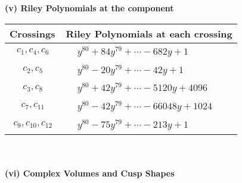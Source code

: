 \documentclass[1p]{elsarticle_modified}
\theoremstyle{definition}
\begin{document}
\newpage\renewcommand{\arraystretch}{1}
\flushleft \textbf{(v) Riley Polynomials at the component}\newline \\
\begin{tabular}{m{50pt}|m{274pt}}
Crossings & \hspace{64pt}Riley Polynomials at each crossing \\
\hline $$\begin{aligned}c_{1},c_{4},c_{6}\end{aligned}$$&$\begin{aligned}
&y^{80}+84 y^{79}+\cdots-682 y+1
\end{aligned}$\\
\hline $$\begin{aligned}c_{2},c_{5}\end{aligned}$$&$\begin{aligned}
&y^{80}-20 y^{79}+\cdots-42 y+1
\end{aligned}$\\
\hline $$\begin{aligned}c_{3},c_{8}\end{aligned}$$&$\begin{aligned}
&y^{80}+42 y^{79}+\cdots-5120 y+4096
\end{aligned}$\\
\hline $$\begin{aligned}c_{7},c_{11}\end{aligned}$$&$\begin{aligned}
&y^{80}-42 y^{79}+\cdots-66048 y+1024
\end{aligned}$\\
\hline $$\begin{aligned}c_{9},c_{10},c_{12}\end{aligned}$$&$\begin{aligned}
&y^{80}-75 y^{79}+\cdots-213 y+1
\end{aligned}$\\
\hline
\end{tabular}\\~\\
\newpage\flushleft \textbf{(vi) Complex Volumes and Cusp Shapes}
\end{document}
